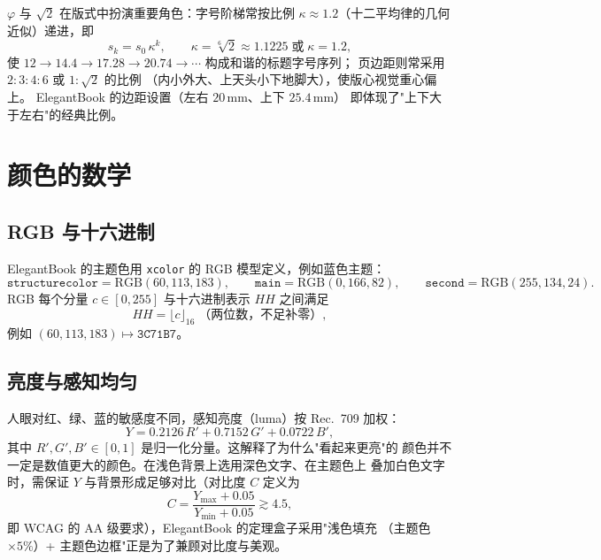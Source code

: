 $\varphi$ 与 $\sqrt{2}$ 在版式中扮演重要角色：字号阶梯常按比例
$\kappa\approx1.2$（十二平均律的几何近似）递进，即
\begin{equation}
  s_k = s_0\, \kappa^{k}, \qquad \kappa = \sqrt[6]{2}\approx1.1225
  \;\text{或}\; \kappa=1.2,
  \label{eq:fontscale}
\end{equation}
使 $12\to14.4\to17.28\to20.74\to\cdots$ 构成和谐的标题字号序列；
页边距则常采用 $2:3:4:6$ 或 $1:\sqrt{2}$ 的比例
（内小外大、上天头小下地脚大），使版心视觉重心偏上。
ElegantBook 的边距设置（左右 $20\,\mathrm{mm}$、上下 $25.4\,\mathrm{mm}$）
即体现了"上下大于左右"的经典比例。

\section{颜色的数学}

\subsection{RGB 与十六进制}

ElegantBook 的主题色用 \texttt{xcolor} 的 RGB 模型定义，例如蓝色主题：
\begin{equation*}
  \texttt{structurecolor} = \mathrm{RGB}(60,113,183),
  \qquad
  \texttt{main} = \mathrm{RGB}(0,166,82),
  \qquad
  \texttt{second} = \mathrm{RGB}(255,134,24).
\end{equation*}
RGB 每个分量 $c\in[0,255]$ 与十六进制表示 $HH$ 之间满足
\begin{equation}
  HH = \lfloor c \rfloor_{16} \;\text{（两位数，不足补零）},
\end{equation}
例如 $(60,113,183)\mapsto \texttt{3C71B7}$。

\subsection{亮度与感知均匀}

人眼对红、绿、蓝的敏感度不同，感知亮度（luma）按 Rec.~709 加权：
\begin{equation}
  Y = 0.2126\,R' + 0.7152\,G' + 0.0722\,B',
  \label{eq:luma}
\end{equation}
其中 $R',G',B'\in[0,1]$ 是归一化分量。这解释了为什么"看起来更亮"的
颜色并不一定是数值更大的颜色。在浅色背景上选用深色文字、在主题色上
叠加白色文字时，需保证 $Y$ 与背景形成足够对比（对比度 $C$ 定义为
\begin{equation}
  C = \frac{Y_{\max}+0.05}{Y_{\min}+0.05} \gtrsim 4.5,
  \label{eq:contrast}
\end{equation}
即 WCAG 的 AA 级要求），ElegantBook 的定理盒子采用"浅色填充
（主题色 $\times 5\%$）+ 主题色边框"正是为了兼顾对比度与美观。

